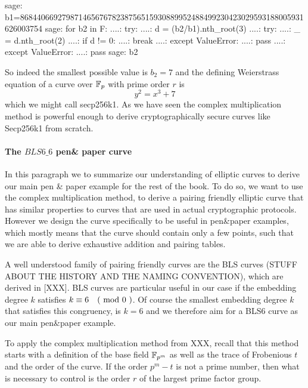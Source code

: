 \begin{example}
\begin{sagecommandline}
sage: b1=86844066927987146567678238756515930889952488499230423029593188005931626003754
sage: for b2 in F:
....:     try:
....:         d = (b2/b1).nth_root(3)
....:         try:
....:             _ = d.nth_root(2)
....:             if d != 0:
....:                 break
....:         except ValueError:
....:             pass
....:     except ValueError:
....:         pass
sage: b2
\end{sagecommandline}
So indeed the smallest possible value is $b_2=7$ and the defining Weierstrass equation of a curve over $\mathbb{F}_p$ with prime order $r$ is 
$$
y^2 = x^3 + 7
$$
which we might call secp256k1. As we have seen the complex multiplication method is powerful enough to derive cryptographically secure curves like Secp256k1 from scratch.
\end{example}

\paragraph{The $BLS6\_6$ pen\& paper curve}
In this paragraph we to summarize our understanding of elliptic curves to derive our main pen \& paper example for the rest of the book. To do so, we want to use the complex multiplication method, to derive a pairing friendly elliptic curve that has similar properties to curves that are used in actual cryptographic protocols. However we design the curve specifically to be useful in pen\&{}paper examples, which mostly means that the curve should contain only a few points, such that we are able to derive exhaustive addition and pairing tables.

A well understood family of pairing friendly curves are the BLS curves (STUFF ABOUT THE HISTORY AND THE NAMING CONVENTION), which are derived in [XXX]. BLS curves are particular useful in our case if the embedding degree $k$ satisfies $k \equiv 6 \quad \text{( mod } 0 \text{ )}$. Of course the smallest embedding degree $k$ that satisfies this congruency, is $k=6$ and we therefore aim for a BLS6 curve as our main pen\&{}paper example. 

To apply the complex multiplication method from XXX, recall that this method starts with a definition of the base field $\mathbb{F}_{p^m}$ as well as the trace of Frobenious $t$ and the order of the curve. If the order $p^m-t$ is not a prime number, then  what is necessary to control is the order $r$ of the largest prime factor group. 

